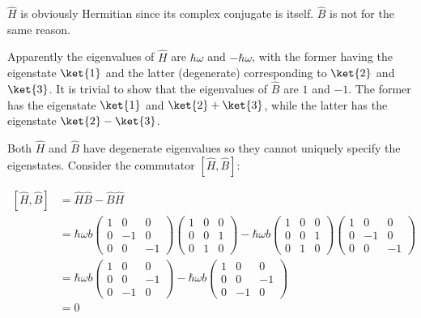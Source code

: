 \documentclass[12pt]{article}
\begin{document}
$\hat{H}$ is obviously Hermitian since its complex conjugate is itself. $\hat{B}$ is not for the same reason. 

Apparently the eigenvalues of $\hat{H}$ are $\hbar \omega$ and $-\hbar \omega$, with the former having the eigenstate $\ket{1}$ and the latter (degenerate) corresponding to $\ket{2}$ and $\ket{3}$. It is trivial to show that the eigenvalues of $\hat{B}$ are $1$ and $-1$. The former has the eigenstate $\ket{1}$ and $\ket{2} + \ket{3}$, while the latter has the eigenstate $\ket{2} - \ket{3}$.

Both $\hat{H}$ and $\hat{B}$ have degenerate eigenvalues so they cannot uniquely specify the eigenstates. Consider the commutator $[\hat{H}, \hat{B}]$:

\begin{equation}
\begin{split}
    [\hat{H}, \hat{B}] &= \hat{H} \hat{B} - \hat{B} \hat{H} \\
    &= 
    \hbar \omega b
    \begin{pmatrix}
        1 & 0 & 0 \\
        0 & -1 & 0 \\
        0 & 0 & -1
    \end{pmatrix}
    \begin{pmatrix}
        1 & 0 & 0 \\
        0 & 0 & 1 \\
        0 & 1 & 0
    \end{pmatrix}
    -
    \hbar \omega b
    \begin{pmatrix}
        1 & 0 & 0 \\
        0 & 0 & 1 \\
        0 & 1 & 0
    \end{pmatrix}
    \begin{pmatrix}
        1 & 0 & 0 \\
        0 & -1 & 0 \\
        0 & 0 & -1
    \end{pmatrix} \\
    &= \hbar \omega b
    \begin{pmatrix}
        1 & 0 & 0 \\
        0 & 0 & -1 \\
        0 & -1 & 0
    \end{pmatrix}
    -
    \hbar \omega b
    \begin{pmatrix}
        1 & 0 & 0 \\
        0 & 0 & -1 \\
        0 & -1 & 0
    \end{pmatrix} \\
    &= 0    
\end{split}
\end{equation}
\end{document}
